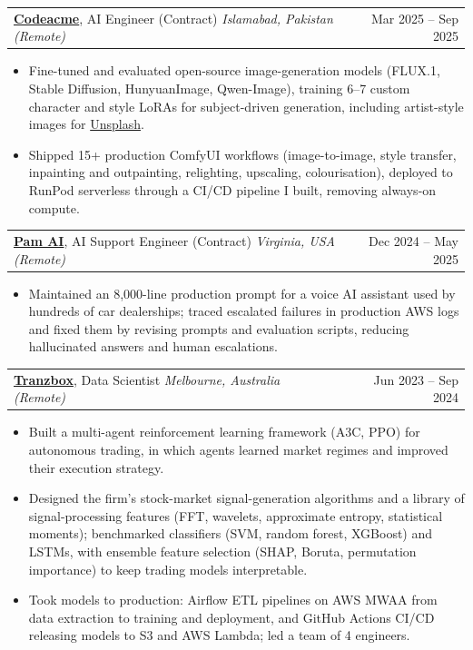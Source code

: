 \documentclass[10pt,letterpaper]{article}
\makeatletter
\newcommand{\role}[4]{%
  \par\vspace{4pt}\begin{tabularx}{\textwidth}{@{}X r@{}}
    \textbf{#1}, #2 \;\textbar\; \textit{#3} & #4 \\
  \end{tabularx}}
\makeatother
\begin{document}
\role{\href{https://codeacme.com/}{Codeacme}}{AI Engineer (Contract)}{Islamabad, Pakistan (Remote)}{Mar 2025 -- Sep 2025}
\begin{itemize}
  \item Fine-tuned and evaluated open-source image-generation models (FLUX.1, Stable Diffusion, HunyuanImage, Qwen-Image), training 6--7 custom character and style LoRAs for subject-driven generation, including artist-style images for \href{https://unsplash.com/}{Unsplash}.
  \item Shipped 15+ production ComfyUI workflows (image-to-image, style transfer, inpainting and outpainting, relighting, upscaling, colourisation), deployed to RunPod serverless through a CI/CD pipeline I built, removing always-on compute.
\end{itemize}

\role{\href{https://pam.ai/}{Pam AI}}{AI Support Engineer (Contract)}{Virginia, USA (Remote)}{Dec 2024 -- May 2025}
\begin{itemize}
  \item Maintained an 8,000-line production prompt for a voice AI assistant used by hundreds of car dealerships; traced escalated failures in production AWS logs and fixed them by revising prompts and evaluation scripts, reducing hallucinated answers and human escalations.
\end{itemize}

\role{\href{https://tranzbox.au/}{Tranzbox}}{Data Scientist}{Melbourne, Australia (Remote)}{Jun 2023 -- Sep 2024}
\begin{itemize}
  \item Built a multi-agent reinforcement learning framework (A3C, PPO) for autonomous trading, in which agents learned market regimes and improved their execution strategy.
  \item Designed the firm's stock-market signal-generation algorithms and a library of signal-processing features (FFT, wavelets, approximate entropy, statistical moments); benchmarked classifiers (SVM, random forest, XGBoost) and LSTMs, with ensemble feature selection (SHAP, Boruta, permutation importance) to keep trading models interpretable.
  \item Took models to production: Airflow ETL pipelines on AWS MWAA from data extraction to training and deployment, and GitHub Actions CI/CD releasing models to S3 and AWS Lambda; led a team of 4 engineers.
\end{itemize}

\end{document}
